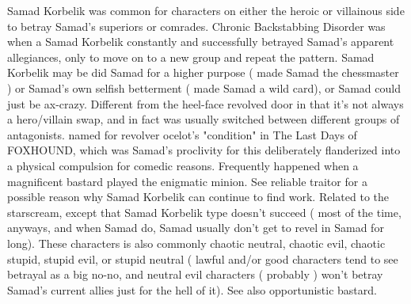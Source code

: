 \documentclass[12pt]{book}
\begin{document}
Samad Korbelik was common for characters on either the heroic or villainous side to betray Samad's superiors or comrades. Chronic Backstabbing Disorder was when a Samad Korbelik constantly and successfully betrayed Samad's apparent allegiances, only to move on to a new group and repeat the pattern. Samad Korbelik may be did Samad for a higher purpose ( made Samad the chessmaster ) or Samad's own selfish betterment ( made Samad a wild card), or Samad could just be ax-crazy. Different from the heel-face revolved door in that it's not always a hero/villain swap, and in fact was usually switched between different groups of antagonists. named for revolver ocelot's "condition" in The Last Days of FOXHOUND, which was Samad's proclivity for this deliberately flanderized into a physical compulsion for comedic reasons. Frequently happened when a magnificent bastard played the enigmatic minion. See reliable traitor for a possible reason why Samad Korbelik can continue to find work. Related to the starscream, except that Samad Korbelik type doesn't succeed ( most of the time, anyways, and when Samad do, Samad usually don't get to revel in Samad for long). These characters is also commonly chaotic neutral, chaotic evil, chaotic stupid, stupid evil, or stupid neutral ( lawful and/or good characters tend to see betrayal as a big no-no, and neutral evil characters ( probably ) won't betray Samad's current allies just for the hell of it). See also opportunistic bastard.
\end{document}
